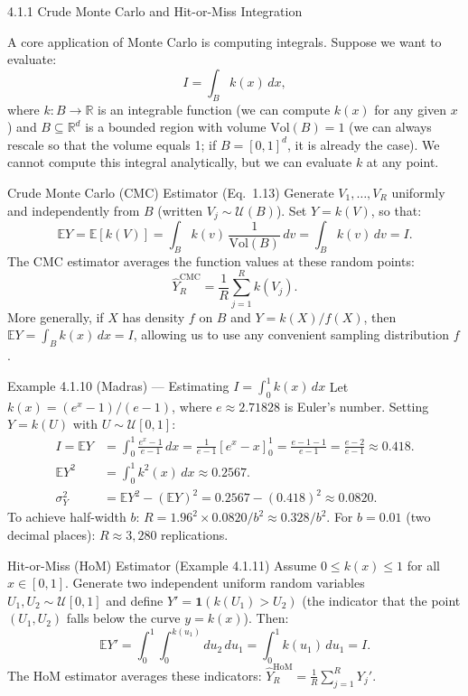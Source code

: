\documentclass[aspectratio=169,10pt]{beamer}
\begin{document}
\begin{frame}[allowframebreaks]{4.1.1 Crude Monte Carlo and Hit-or-Miss Integration}

A core application of Monte Carlo is computing integrals.  Suppose we
want to evaluate:
\[
  I = \int_B k(x)\,dx,
\]
where $k : B \to \mathbb{R}$ is an integrable function (we can compute
$k(x)$ for any given $x$) and $B \subseteq \mathbb{R}^d$ is a bounded
region with volume $\mathrm{Vol}(B) = 1$ (we can always rescale so that
the volume equals 1; if $B = [0,1]^d$, it is already the case).  We
cannot compute this integral analytically, but we can evaluate $k$ at
any point.

\begin{block}{Crude Monte Carlo (CMC) Estimator (Eq.\ 1.13)}
  Generate $V_1, \ldots, V_R$ uniformly and independently from $B$
  (written $V_j \sim \mathcal{U}(B)$).  Set $Y = k(V)$, so that:
  \[
    \mathbb{E}Y = \mathbb{E}[k(V)] = \int_B k(v)\,\frac{1}{\mathrm{Vol}(B)}\,dv = \int_B k(v)\,dv = I.
  \]
  The CMC estimator averages the function values at these random points:
  \[
    \hat{Y}_R^{\mathrm{CMC}} = \frac{1}{R}\sum_{j=1}^R k(V_j).
    \tag{1.13}
  \]
  More generally, if $X$ has density $f$ on $B$ and $Y = k(X)/f(X)$, then
  $\mathbb{E}Y = \int_B k(x)\,dx = I$, allowing us to use any convenient
  sampling distribution $f$.
\end{block}

\begin{exampleblock}{Example 4.1.10 (Madras) --- Estimating $I = \int_0^1 k(x)\,dx$}
  Let $k(x) = (e^x - 1)/(e - 1)$, where $e \approx 2.71828$ is Euler's
  number.  Setting $Y = k(U)$ with $U \sim \mathcal{U}[0,1]$:
  \begin{align*}
    I = \mathbb{E}Y &= \int_0^1 \frac{e^x - 1}{e - 1}\,dx
      = \frac{1}{e-1}\!\left[e^x - x\right]_0^1
      = \frac{e - 1 - 1}{e - 1} = \frac{e - 2}{e - 1} \approx 0.418. \\
    \mathbb{E}Y^2 &= \int_0^1 k^2(x)\,dx \approx 0.2567. \\
    \sigma_Y^2 &= \mathbb{E}Y^2 - (\mathbb{E}Y)^2 = 0.2567 - (0.418)^2 \approx 0.0820.
  \end{align*}
  To achieve half-width $b$: $R = 1.96^2 \times 0.0820 / b^2 \approx 0.328/b^2$.
  For $b = 0.01$ (two decimal places): $R \approx 3{,}280$ replications.
\end{exampleblock}

\framebreak

\begin{block}{Hit-or-Miss (HoM) Estimator (Example 4.1.11)}
  Assume $0 \leq k(x) \leq 1$ for all $x \in [0,1]$.  Generate two
  independent uniform random variables $U_1, U_2 \sim \mathcal{U}[0,1]$
  and define $Y' = \mathbf{1}(k(U_1) > U_2)$ (the indicator that the
  point $(U_1, U_2)$ falls below the curve $y = k(x)$).  Then:
  \[
    \mathbb{E}Y' = \int_0^1 \int_0^{k(u_1)} du_2\,du_1 = \int_0^1 k(u_1)\,du_1 = I.
  \]
  The HoM estimator averages these indicators:
  $\hat{Y}_R^{\mathrm{HoM}} = \frac{1}{R}\sum_{j=1}^R Y_j'$.


\end{block}
\end{frame}
\end{document}
